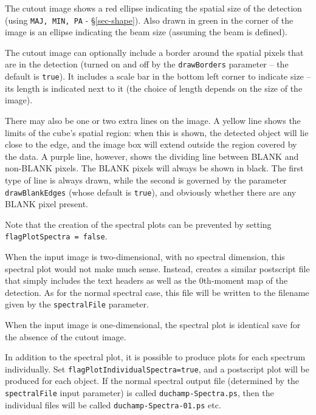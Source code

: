 The cutout image shows a red ellipse indicating the spatial size of the
detection (using \texttt{MAJ, MIN, PA} - \S\ref{sec-shape}). Also
drawn in green in the corner of the image is an ellipse indicating the
beam size (assuming the beam is defined). 

The cutout image can optionally include a border around the spatial
pixels that are in the detection (turned on and off by the
\texttt{drawBorders} parameter -- the default is \texttt{true}). It
includes a scale bar in the bottom left corner to indicate size -- its
length is indicated next to it (the choice of length depends on the
size of the image).

There may also be one or two extra lines on the image. A yellow line
shows the limits of the cube's spatial region: when this is shown, the
detected object will lie close to the edge, and the image box will
extend outside the region covered by the data. A purple line, however,
shows the dividing line between BLANK and non-BLANK pixels. The BLANK
pixels will always be shown in black. The first type of line is always
drawn, while the second is governed by the parameter
\texttt{drawBlankEdges} (whose default is \texttt{true}), and
obviously whether there are any BLANK pixel present.

Note that the creation of the spectral plots can be prevented by
setting \texttt{flagPlotSpectra = false}.

When the input image is two-dimensional, with no spectral dimension,
this spectral plot would not make much sense. Instead, \duchamp
creates a similar postscript file that simply includes the text
headers as well as the 0th-moment map of the detection. As for the
normal spectral case, this file will be written to the filename given
by the \texttt{spectralFile} parameter.

When the input image is one-dimensional, the spectral plot is
identical save for the absence of the cutout image.

In addition to the spectral plot, it is possible to produce plots for
each spectrum individually. Set
\texttt{flagPlotIndividualSpectra=true}, and a postscript plot will be
produced for each object. If the normal spectral output file
(determined by the \texttt{spectralFile} input parameter) is called
\texttt{duchamp-Spectra.ps}, then the individual files will be called
\texttt{duchamp-Spectra-01.ps} etc. 


\label{sec-spatialmaps}

